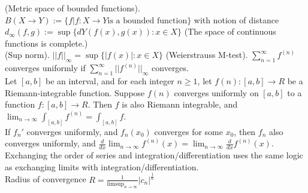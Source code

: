 \documentclass[10pt]{article}
\begin{document}
\begin{small}
(Metric space of bounded functions). $B(X\rightarrow Y):=\{f|f:X\rightarrow Y \text{is a bounded function}\}$ with notion of distance $d_\infty(f,g) := \sup\{dY (f(x),g(x)) : x \in X\}$ (The space of continuous functions is complete.)\\

(Sup norm). $||f||_\infty=\sup\{|f(x)|:x\in X\}$ (Weierstrauss M-test). $\displaystyle\sum_{n=1}^{\infty}f^{(n)}$ converges uniformly if $\displaystyle\sum_{n=1}^{\infty}||f^{(n)}||_\infty$ converges.\\

Let $[a, b]$ be an interval, and for each integer $n \ge 1$, let $f (n) : [a, b] \rightarrow R$ be a Riemann-integrable function. Suppose $f (n)$ converges uniformly on $[a, b]$ to a function $f : [a, b] \rightarrow R$. Then $f$ is also Riemann integrable, and $\displaystyle\lim_{n\rightarrow\infty}\int_{[a,b]}f^{(n)}=\int_{[a,b]}f$.\\

If $f_n'$ converges uniformly, and $f_n(x_0)$ converges for some $x_0$, then $f_n$ also converges uniformly, and $\frac{d}{dx}\lim_{n\rightarrow\infty}f^{(n)}(x)=\lim_{n\rightarrow\infty}\frac{d}{dx}f^{(n)}(x)$.\\

Exchanging the order of series and integration/differentiation uses the same logic as exchanging limits with integration/differentiation.\\

Radius of convergence $R=\frac{1}{\limsup_{n\rightarrow\infty}}|c_n|^\frac{1}{n}$\\


\end{small}
\end{document}
